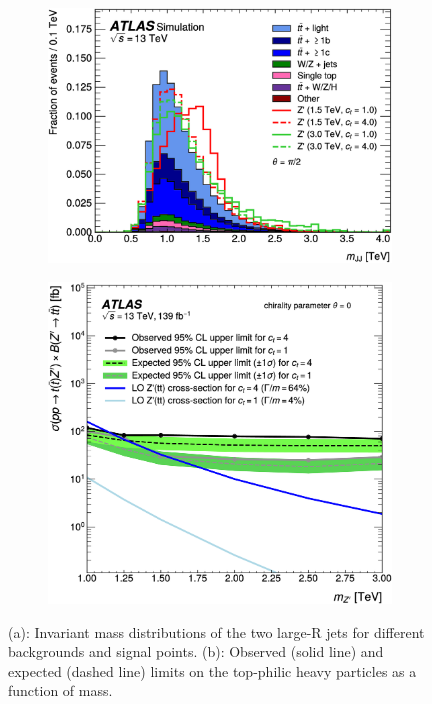 \documentclass{moriond}
\begin{document}
\begin{figure}[htp]
     \centering
     \begin{subfigure}[b]{0.35\textwidth}
         \centering
         \includegraphics[width=\textwidth]{mass}
         \caption{}
         \label{fig:mass}
     \end{subfigure}
     \begin{subfigure}[b]{0.28\textwidth}
         \centering
         \includegraphics[width=\textwidth]{tttt}
         \caption{}
         \label{fig:ttttlimits}
     \end{subfigure}
        \caption{(a): Invariant mass distributions of the two large-R jets for different backgrounds and signal points. (b): Observed (solid line) and expected (dashed line) limits on the top-philic heavy particles as a function of mass\protect\cite{tttt}.}
        \label{fig:tttt}
\end{figure}
\end{document}
